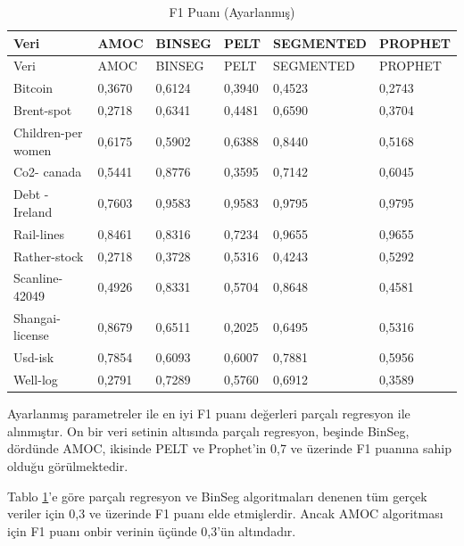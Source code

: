 \documentclass[12pt,twoside]{deuthesis}
\begin{document}
\begin{longtable}[]{@{}llllll@{}}
\caption{\label{tab:nvar4} F1 Puanı (Ayarlanmış)}\tabularnewline
\toprule\noalign{}
Veri & AMOC & BINSEG & PELT & SEGMENTED & PROPHET \\
\midrule\noalign{}
\endfirsthead
\toprule\noalign{}
Veri & AMOC & BINSEG & PELT & SEGMENTED & PROPHET \\
\midrule\noalign{}
\endhead
\bottomrule\noalign{}
\endlastfoot
Bitcoin & 0,3670 & 0,6124 & 0,3940 & 0,4523 & 0,2743 \\
Brent-spot & 0,2718 & 0,6341 & 0,4481 & 0,6590 & 0,3704 \\
Children-per women & 0,6175 & 0,5902 & 0,6388 & 0,8440 & 0,5168 \\
Co2- canada & 0,5441 & 0,8776 & 0,3595 & 0,7142 & 0,6045 \\
Debt -Ireland & 0,7603 & 0,9583 & 0,9583 & 0,9795 & 0,9795 \\
Rail-lines & 0,8461 & 0,8316 & 0,7234 & 0,9655 & 0,9655 \\
Rather-stock & 0,2718 & 0,3728 & 0,5316 & 0,4243 & 0,5292 \\
Scanline-42049 & 0,4926 & 0,8331 & 0,5704 & 0,8648 & 0,4581 \\
Shangai-license & 0,8679 & 0,6511 & 0,2025 & 0,6495 & 0,5316 \\
Usd-isk & 0,7854 & 0,6093 & 0,6007 & 0,7881 & 0,5956 \\
Well-log & 0,2791 & 0,7289 & 0,5760 & 0,6912 & 0,3589 \\
\end{longtable}

Ayarlanmış parametreler ile en iyi F1 puanı değerleri parçalı regresyon ile alınmıştır. On bir veri setinin altısında parçalı regresyon, beşinde BinSeg, dördünde AMOC, ikisinde PELT ve Prophet'in 0,7 ve üzerinde F1 puanına sahip olduğu görülmektedir.

Tablo \ref{tab:nvar4}'e göre parçalı regresyon ve BinSeg algoritmaları denenen tüm gerçek veriler için 0,3 ve üzerinde F1 puanı elde etmişlerdir. Ancak AMOC algoritması için F1 puanı onbir verinin üçünde 0,3'ün altındadır.
\end{document}
